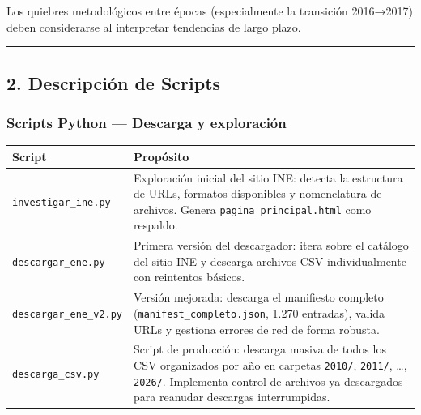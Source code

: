 \documentclass[
]{article}
\newcounter{none} %
\begin{document}
Los quiebres metodológicos entre épocas (especialmente la transición
2016→2017) deben considerarse al interpretar tendencias de largo plazo.

\begin{center}\rule{0.5\linewidth}{0.5pt}\end{center}

\subsection{2. Descripción de Scripts}\label{descripciuxf3n-de-scripts}

\subsubsection{Scripts Python --- Descarga y
exploración}\label{scripts-python-descarga-y-exploraciuxf3n}

{\def\LTcaptype{none} %
\begin{longtable}[]{@{}
  >{\raggedright\arraybackslash}p{}
  >{\raggedright\arraybackslash}p{}@{}}
\toprule\noalign{}
\begin{minipage}[b]{\linewidth}\raggedright
Script
\end{minipage} & \begin{minipage}[b]{\linewidth}\raggedright
Propósito
\end{minipage} \\
\midrule\noalign{}
\endhead
\bottomrule\noalign{}
\endlastfoot
\texttt{investigar\_ine.py} & Exploración inicial del sitio INE: detecta
la estructura de URLs, formatos disponibles y nomenclatura de archivos.
Genera \texttt{pagina\_principal.html} como respaldo. \\
\texttt{descargar\_ene.py} & Primera versión del descargador: itera
sobre el catálogo del sitio INE y descarga archivos CSV individualmente
con reintentos básicos. \\
\texttt{descargar\_ene\_v2.py} & Versión mejorada: descarga el
manifiesto completo (\texttt{manifest\_completo.json}, 1.270 entradas),
valida URLs y gestiona errores de red de forma robusta. \\
\texttt{descarga\_csv.py} & Script de producción: descarga masiva de
todos los CSV organizados por año en carpetas \texttt{2010/},
\texttt{2011/}, \ldots, \texttt{2026/}. Implementa control de archivos
ya descargados para reanudar descargas interrumpidas. \\
\end{longtable}
}
\end{document}
